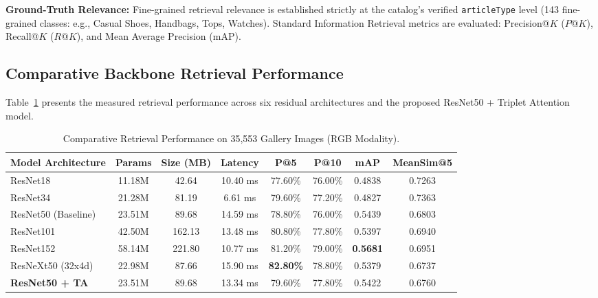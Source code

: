 \documentclass[runningheads]{llncs}
\begin{document}
\noindent\textbf{Ground-Truth Relevance:} Fine-grained retrieval relevance is established strictly at the catalog's verified \texttt{articleType} level (143 fine-grained classes: e.g., Casual Shoes, Handbags, Tops, Watches). Standard Information Retrieval metrics are evaluated: Precision@$K$ ($P@K$), Recall@$K$ ($R@K$), and Mean Average Precision (mAP).

\subsection{Comparative Backbone Retrieval Performance}
Table~\ref{tab:models} presents the measured retrieval performance across six residual architectures and the proposed ResNet50 + Triplet Attention model.

\begin{table}[t]
\centering
\caption{Comparative Retrieval Performance on 35,553 Gallery Images (RGB Modality).}
\label{tab:models}
\begin{tabular}{lccccccc}
\toprule
\textbf{Model Architecture} & \textbf{Params} & \textbf{Size (MB)} & \textbf{Latency} & \textbf{P@5} & \textbf{P@10} & \textbf{mAP} & \textbf{MeanSim@5} \\
\midrule
ResNet18                    & 11.18M          & 42.64              & 10.40 ms         & 77.60\%      & 76.00\%       & 0.4838       & 0.7263 \\
ResNet34                    & 21.28M          & 81.19              & 6.61 ms          & 79.60\%      & 77.20\%       & 0.4827       & 0.7363 \\
ResNet50 (Baseline)         & 23.51M          & 89.68              & 14.59 ms         & 78.80\%      & 76.00\%       & 0.5439       & 0.6803 \\
ResNet101                   & 42.50M          & 162.13             & 13.48 ms         & 80.80\%      & 77.80\%       & 0.5397       & 0.6940 \\
ResNet152                   & 58.14M          & 221.80             & 10.77 ms         & 81.20\%      & 79.00\%       & \textbf{0.5681} & 0.6951 \\
ResNeXt50 (32x4d)           & 22.98M          & 87.66              & 15.90 ms         & \textbf{82.80\%} & 78.80\%   & 0.5379       & 0.6737 \\
\midrule
\textbf{ResNet50 + TA}      & 23.51M          & 89.68              & 13.34 ms         & 79.60\%      & 77.80\%       & 0.5422       & 0.6760 \\
\bottomrule
\end{tabular}
\end{table}
\end{document}
